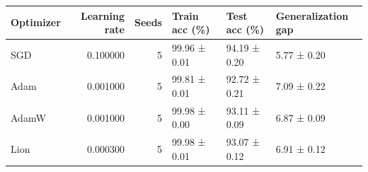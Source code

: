 \begin{tabular}{lrrlll}
\toprule
Optimizer & Learning rate & Seeds & Train acc (\%) & Test acc (\%) & Generalization gap \\
\midrule
SGD & 0.100000 & 5 & 99.96 ± 0.01 & 94.19 ± 0.20 & 5.77 ± 0.20 \\
Adam & 0.001000 & 5 & 99.81 ± 0.01 & 92.72 ± 0.21 & 7.09 ± 0.22 \\
AdamW & 0.001000 & 5 & 99.98 ± 0.00 & 93.11 ± 0.09 & 6.87 ± 0.09 \\
Lion & 0.000300 & 5 & 99.98 ± 0.01 & 93.07 ± 0.12 & 6.91 ± 0.12 \\
\bottomrule
\end{tabular}
